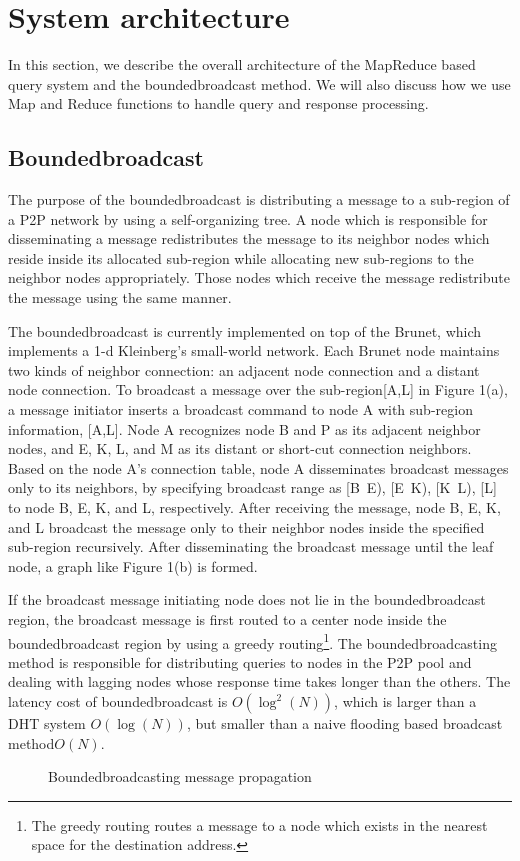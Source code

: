 \documentclass{acm_proc_article-sp}
\begin{document}
\section{System architecture}
In this section, we describe the overall architecture of the MapReduce based query system and the boundedbroadcast method. 
We will also discuss how we use Map and Reduce functions to handle query and response processing.
\subsection{Boundedbroadcast}
The purpose of the boundedbroadcast\cite{deetoo} is distributing a message to a sub-region of a P2P network by using a self-organizing tree.
A node which is responsible for disseminating a message redistributes the message to its neighbor nodes which reside inside its allocated sub-region while allocating new sub-regions to the neighbor nodes appropriately.
Those nodes which receive the message redistribute the message using the same manner.

The boundedbroadcast is currently implemented on top of the Brunet\cite{brunet}, which implements a 1-d Kleinberg's small-world network.
Each Brunet node maintains two kinds of neighbor connection: an adjacent node connection and a distant node connection.
To broadcast a message over the sub-region[A,L] in Figure 1(a), a message initiator inserts a broadcast command to node A with sub-region information, [A,L]. 
Node A recognizes node B and P as its adjacent neighbor nodes, and  E, K, L, and M as its distant or short-cut connection neighbors.
Based on the node A's connection table, node A disseminates broadcast messages only to its neighbors, by specifying broadcast range as [B~E), [E~K), [K~L), [L] to node B, E, K, and L, respectively.
After receiving the message, node B, E, K, and L broadcast the message only to their neighbor nodes inside the specified sub-region recursively. 
After disseminating the broadcast message until the leaf node, a graph like Figure 1(b) is formed.

If the broadcast message initiating node does not lie in the boundedbroadcast region, the broadcast message is first routed to a center node inside the boundedbroadcast region by using a greedy routing\footnote{The greedy routing routes a message to a node which exists in the nearest space for the destination address.}.
The boundedbroadcasting method is responsible for distributing queries to nodes in the P2P pool and dealing with lagging nodes whose response time takes longer than the others. 
The latency cost of boundedbroadcast is  $O(\log^2(N))$\cite{deetoo}, which is larger than a DHT system $O(\log(N))$\cite{chord}, but smaller than a naive flooding based broadcast method$O(N)$.
\begin{figure}
\centering
{}
\caption{Boundedbroadcasting message propagation}
\end{figure}
\end{document}
